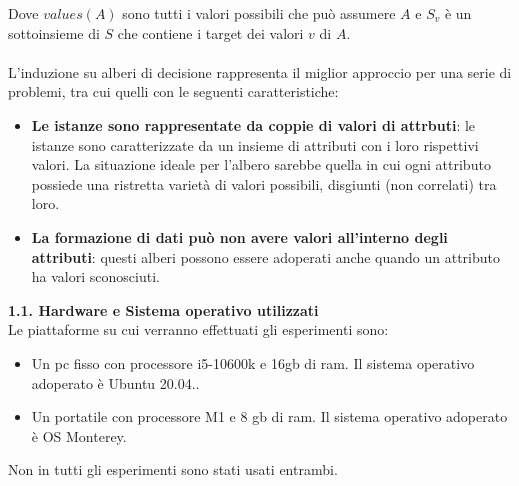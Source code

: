\documentclass[]{article}
\begin{document}
Dove $values(A)$ sono tutti i valori possibili che può assumere $A$ e $S$$_\textit{v}$ è un sottoinsieme di $S$ che contiene i target dei valori $v$ di $A$.\\
\\
L'induzione su alberi di decisione rappresenta il miglior approccio per una serie di problemi, tra cui quelli con le seguenti caratteristiche:
\begin{itemize}
    \item \textbf{Le istanze sono rappresentate da coppie di valori di attrbuti}: le istanze sono caratterizzate da un insieme di attributi con i loro rispettivi valori.
        La situazione ideale per l'albero sarebbe quella in cui ogni attributo possiede una ristretta varietà di valori possibili, disgiunti (non correlati) tra loro.
    \item \textbf{La formazione di dati può non avere valori all'interno degli attributi}: questi alberi possono essere adoperati anche quando un attributo ha valori sconosciuti.
\end{itemize}    

{\large \textbf{{\Large{1}}.{\small{1}}. Hardware e Sistema operativo utilizzati}}\\
Le piattaforme su cui verranno effettuati gli esperimenti sono:
\begin{itemize}
  \item Un pc fisso con processore i5-10600k e 16gb di ram. Il sistema operativo adoperato è Ubuntu 20.04..
  \item Un portatile con processore M1 e 8 gb di ram. Il sistema operativo adoperato è OS Monterey.
\end{itemize}
Non in tutti gli esperimenti sono stati usati entrambi.
\end{document}
